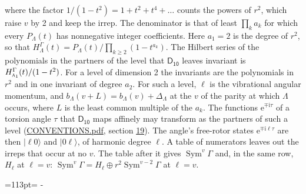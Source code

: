 \documentclass[10pt,a4paper]{article}
\newcommand{\needspace}[1]{\par\penalty-100\begingroup\dimen0=#1\relax\dimen2=\pagegoal
  \advance\dimen2-\pagetotal\ifdim\dimen0>\dimen2\relax\ifdim\dimen2>0pt\vfil\break\fi\fi
  \endgroup}
\numberwithin{equation}{section}
\newcommand{\grp}[1]{\mathsf{#1}}
\newcommand{\irr}[1]{\text{\normalfont\scshape #1}}
\newcommand{\iunit}{\mathrm{i}}
\newcommand{\expe}{\mathrm{e}}
\newcommand{\occ}[1]{\lvert #1\rangle}
\begin{document}
where the factor $1/(1 - t^2) = 1 + t^2 + t^4 + \dots$ counts the powers of $r^2$, which raise $v$ by 2 and keep the irrep. The denominator is that of least $\prod_k a_k$ for which every $P_\Lambda(t)$ has nonnegative integer coefficients. Here $a_1 = 2$ is the degree of $r^2$, so that $H^{\Gamma}_\Lambda(t) = P_\Lambda(t)/\prod_{k\ge2}(1 - t^{a_k})$. The Hilbert series of the polynomials in the partners of the level that $\grp{D_{10}}$ leaves invariant is $H^{\Gamma}_{\irr{a}_{1}}(t)/(1 - t^2)$. For a level of dimension 2 the invariants are the polynomials in $r^2$ and in one invariant of degree $a_2$. \label{n:index.overtone.period}\label{n:index.increment.unitary}For such a level, $\ell$ is the vibrational angular momentum, and $b_\Lambda(v + L) = b_\Lambda(v) + \Delta_\Lambda$ at the $v$ of the parity at which $\Lambda$ occurs, where $L$ is the least common multiple of the $a_k$. \label{n:local.torsion.angle}The functions $\expe^{\mp\iunit\tau}$ of a torsion angle $\tau$ that $\grp{D_{10}}$ maps affinely may transform as the partners of such a level (\href{../../CONVENTIONS.pdf}{CONVENTIONS.pdf}, section \href{../../CONVENTIONS.pdf\#conv.19}{19}). The angle's free-rotor states $\expe^{\mp\iunit\ell\tau}$ are then $\occ{\ell 0}$ and $\occ{0 \ell}$, of harmonic degree $\ell$. A table of numerators leaves out the irreps that occur at no $v$. The table after it gives $\operatorname{Sym}^{v}\Gamma$ and, in the same row, $H_\ell$ at $\ell = v$: $\operatorname{Sym}^{v}\Gamma = H_\ell \oplus r^2\operatorname{Sym}^{v-2}\Gamma$ at $\ell = v$.
\needspace{113pt}
\end{document}
